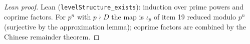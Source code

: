 \begin{proof}[Lean proof]
Lean (\texttt{levelStructure\_exists}): induction over prime powers and coprime factors. For $p^n$ with $p\nmid D$ the map is $\iota_p$ of item 19 reduced modulo $p^n$ (surjective by the approximation lemma); coprime factors are combined by the Chinese remainder theorem.
\end{proof}

